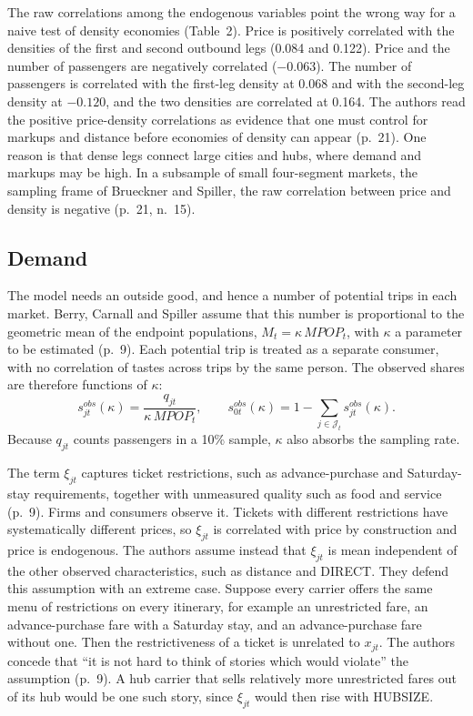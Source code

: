 The raw correlations among the endogenous variables point the wrong way for a naive test of density
economies (Table~2). Price is positively correlated with the densities of the first and second outbound legs
(0.084 and 0.122). Price and the number of passengers are negatively correlated ($-0.063$). The number of
passengers is correlated with the first-leg density at 0.068 and with the second-leg density at $-0.120$,
and the two densities are correlated at 0.164. The authors read the positive price-density correlations as
evidence that one must control for markups and distance before economies of density can appear (p.~21). One
reason is that dense legs connect large cities and hubs, where demand and markups may be high. In a
subsample of small four-segment markets, the sampling frame of Brueckner and Spiller, the raw correlation
between price and density is negative (p.~21, n.~15).

\subsection{Demand}\label{sec:09-bcs-demand}

The model needs an outside good, and hence a number of potential trips in each market. Berry, Carnall and
Spiller assume that this number is proportional to the geometric mean of the endpoint populations,
$M_t=\kappa\,\mathit{MPOP}_t$, with $\kappa$ a parameter to be estimated (p.~9). Each potential trip is
treated as a separate consumer, with no correlation of tastes across trips by the same person. The
observed shares are therefore functions of $\kappa$:
\begin{equation}\label{eq:09-bcs-sobs}
s^{obs}_{jt}(\kappa)=\frac{q_{jt}}{\kappa\,\mathit{MPOP}_t},\qquad
s^{obs}_{0t}(\kappa)=1-\sum_{j\in\mathcal{J}_t}s^{obs}_{jt}(\kappa).
\end{equation}
Because $q_{jt}$ counts passengers in a 10\% sample, $\kappa$ also absorbs the sampling rate.

The term $\xi_{jt}$ captures ticket restrictions, such as advance-purchase and Saturday-stay requirements,
together with unmeasured quality such as food and service (p.~9). Firms and consumers observe it. Tickets
with different restrictions have systematically different prices, so $\xi_{jt}$ is correlated with price
by construction and price is endogenous. The authors assume instead that $\xi_{jt}$ is mean independent of
the other observed characteristics, such as distance and DIRECT. They defend this assumption with an
extreme case. Suppose every carrier offers the same menu of restrictions on every itinerary, for example
an unrestricted fare, an advance-purchase fare with a Saturday stay, and an advance-purchase fare without
one. Then the restrictiveness of a ticket is unrelated to $x_{jt}$. The authors concede that ``it is not
hard to think of stories which would violate'' the assumption (p.~9). A hub carrier that sells relatively
more unrestricted fares out of its hub would be one such story, since $\xi_{jt}$ would then rise with
HUBSIZE.

